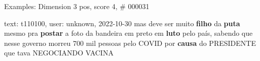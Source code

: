 \begin{frame}{Examples: Dimension 3 pos, score 4, \# 000031}
\footnotesize
\begin{exampleblock}{text: t110100, user: unknown, 2022-10-30}
mas deve ser muito \textbf{filho} da \textbf{puta} mesmo pra \textbf{postar} a 
foto da bandeira em preto em \textbf{luto} pelo país, sabendo que nesse governo 
morreu 700 mil pessoas pelo COVID por \textbf{causa} do PRESIDENTE que tava 
NEGOCIANDO VACINA 
\end{exampleblock}
\end{frame}
